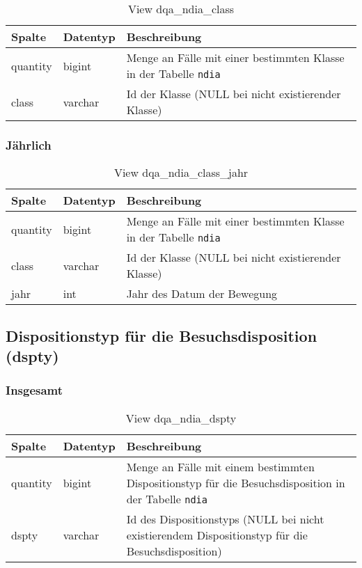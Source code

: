 \begin{table}[ht]
	\centering   
	\caption{View dqa\_ndia\_class}
	\label{tab:bewClassI}
	\begin{tabular}{||l|l|p{10cm}||}   		
		\hline
		Spalte & Datentyp & Beschreibung \\ [0.5ex]
		\hline\hline
		quantity & bigint & Menge an Fälle mit einer bestimmten Klasse in der Tabelle \texttt{ndia} \\
		\hline
		class & varchar & Id der Klasse (NULL bei nicht existierender Klasse)\\
		\hline
		
	\end{tabular}
\end{table}

\subsubsection{Jährlich} \label{subsubsec:bewClassJ}

\begin{table}[ht]
	\centering   
	\caption{View dqa\_ndia\_class\_jahr}
	\label{tab:bewClassJ}
	\begin{tabular}{||l|l|p{10cm}||}   		
		\hline
		Spalte & Datentyp & Beschreibung \\ [0.5ex]
		\hline\hline
		quantity & bigint & Menge an Fälle mit einer bestimmten Klasse in der Tabelle \texttt{ndia}\\
		\hline
		class & varchar & Id der Klasse (NULL bei nicht existierender Klasse)\\
		\hline
		jahr & int &  Jahr des Datum der Bewegung \\
		\hline		
	\end{tabular}
\end{table}

\newpage

\subsection{Dispositionstyp für die Besuchsdisposition (dspty)} \label{subsec:bewdspty}

\subsubsection{Insgesamt} \label{subsubsec:bewDsptyI}

\begin{table}[ht]
	\centering   
	\caption{View dqa\_ndia\_dspty}
	\label{tab:bewDsptyI}
	\begin{tabular}{||l|l|p{10cm}||}   		
		\hline
		Spalte & Datentyp & Beschreibung \\ [0.5ex]
		\hline\hline
		quantity & bigint & Menge an Fälle mit einem bestimmten Dispositionstyp für die Besuchsdisposition in der Tabelle \texttt{ndia} \\
		\hline
		dspty & varchar & Id des Dispositionstyps (NULL bei nicht existierendem Dispositionstyp für die Besuchsdisposition)\\
		\hline
		
	\end{tabular}
\end{table}

